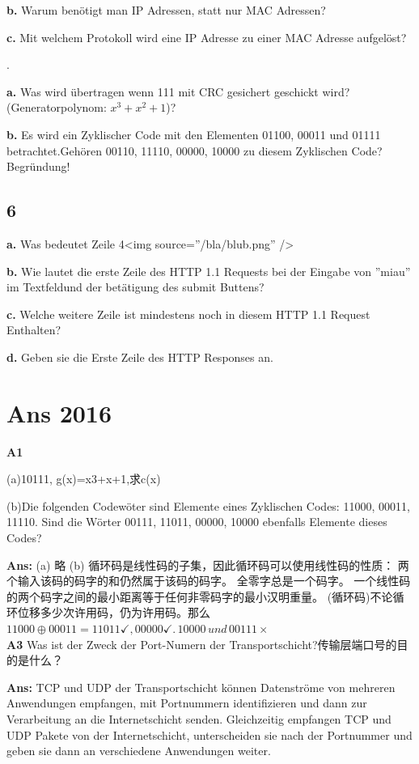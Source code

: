 \documentclass[fleqn]{article}
\begin{document}
\textbf{b.} Warum benötigt man IP Adressen, statt nur MAC Adressen?

\textbf{c.} Mit welchem Protokoll wird eine IP Adresse zu einer MAC Adresse aufgelöst?

.

\textbf{a.} Was wird übertragen wenn 111 mit CRC gesichert geschickt wird? (Generatorpolynom: $x^3+x^2+1$)?

\textbf{b.} Es wird ein Zyklischer Code mit den Elementen 01100, 00011 und 01111 betrachtet.Gehören 00110, 11110, 00000, 10000 zu diesem Zyklischen Code? Begründung!

\subsection{6}

\noindent \qquad \textbf{a.} Was bedeutet Zeile 4<img source=”/bla/blub.png” />

\noindent\qquad \textbf{b.} Wie lautet die erste Zeile des HTTP 1.1 Requests bei der Eingabe von ”miau” im Textfeldund der betätigung des submit Buttens?

\noindent\qquad \textbf{c.} Welche weitere Zeile ist mindestens noch in diesem HTTP 1.1 Request Enthalten?

\noindent\qquad \textbf{d.} Geben sie die Erste Zeile des HTTP Responses an.

\section{Ans 2016}

\noindent\textbf{A1}

(a)10111, g(x)=x3+x+1,求c(x)

(b)Die folgenden Codewöter sind Elemente eines Zyklischen Codes: 11000, 00011, 11110. Sind die Wörter 00111, 11011, 00000, 10000 ebenfalls Elemente dieses Codes?

\textbf{Ans:} (a) 略 (b) 循环码是线性码的子集，因此循环码可以使用线性码的性质：
两个输入该码的码字的和仍然属于该码的码字。
全零字总是一个码字。
一个线性码的两个码字之间的最小距离等于任何非零码字的最小汉明重量。
(循环码)不论循环位移多少次许用码，仍为许用码。那么$11000\oplus00011=11011\checkmark,00000\checkmark.\,10000\, und\, 00111\times $
\\
\noindent\textbf{A3} Was ist der Zweck der Port-Numern der Transportschicht?传输层端口号的目的是什么？

\textbf{Ans:} TCP und UDP der Transportschicht können Datenströme von mehreren Anwendungen empfangen, mit Portnummern identifizieren und dann zur Verarbeitung an die Internetschicht senden.
Gleichzeitig empfangen TCP und UDP Pakete von der Internetschicht, unterscheiden sie nach der Portnummer und geben sie dann an verschiedene Anwendungen weiter.
\end{document}
